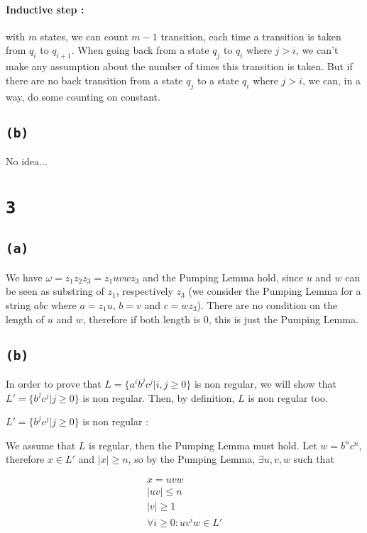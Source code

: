 \documentclass[a4paper,11pt]{report}
\begin{document}
\paragraph{Inductive step :} with $m$ states, we can count $m-1$ transition,
each time a transition is taken from $q_i$ to $q_{i+1}$. When going back from a
state $q_j$ to $q_i$ where $j > i$, we can't make any assumption about the
number of times this transition is taken. But if there are no back transition
from a state $q_j$ to a state $q_i$ where $j > i$, we can, in a way, do some
counting on constant.

\subsection*{\texttt{(b)}}

No idea...

\section*{\texttt{3}}

\subsection*{\texttt{(a)}}

We have $\omega = z_1z_2z_3 = z_1uvwz_3$ and the Pumping
Lemma hold, since $u$ and $w$ can be seen as substring of $z_1$, respectively
$z_3$ (we consider the Pumping Lemma for a string $abc$ where $a = z_1u$, $b =
v$ and $c = wz_3$). There are no condition on the length of $u$ and $w$,
therefore if both length is $0$, this is just the Pumping Lemma.

\subsection*{\texttt{(b)}}

In order to prove that $L = \{a^ib^jc^j | i,j \geq 0\}$ is non regular, we will show
that $L' = \{b^jc^j | j \geq 0\}$ is non regular. Then, by definition, $L$ is
non regular too.

$L' = \{b^jc^j | j \geq 0\}$ is non regular :

We assume that $L$ is regular, then the Pumping Lemma must hold. Let $w =
b^nc^n$, therefore $x \in L'$ and $|x| \geq n$, so by the Pumping Lemma,
$\exists u,v,w$ such that

\begin{gather}
  x = uvw \\
  |uv| \leq n \\
  |v| \geq 1 \\
  \forall i \geq 0 : uv^iw \in L'
\end{gather}
\end{document}
